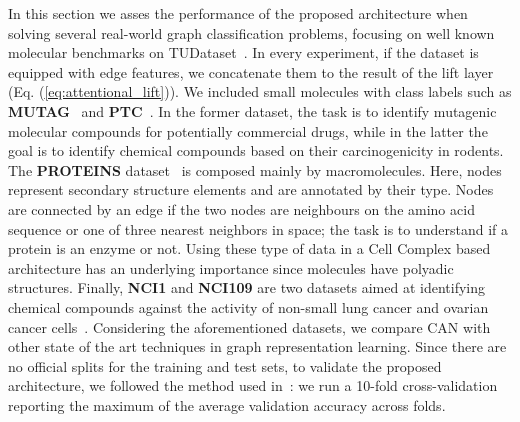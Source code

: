 \documentclass{article}
\begin{document}
In this section we asses the performance of the proposed architecture when solving several real-world graph classification problems, focusing on well known molecular benchmarks on TUDataset~\cite{TUDataset}. In every experiment, if the dataset is equipped with edge features, we concatenate them to the result of the lift layer (Eq. (\ref{eq:attentional_lift})). We included small molecules with class labels such as \textbf{MUTAG}~\cite{kazius2005derivation} and \textbf{PTC}~\cite{helma2001predictive}. In the former dataset, the task is  to identify mutagenic molecular compounds for potentially commercial drugs, while in the latter the goal is to identify chemical compounds based on their carcinogenicity in rodents. The \textbf{PROTEINS} dataset~\cite{dobson2003distinguishing} is composed mainly by macromolecules. Here, nodes represent secondary structure elements and are annotated by their type. Nodes are connected by an edge if the two nodes are neighbours on the amino acid sequence or one of three nearest neighbors in space; the task is to understand if a protein is an enzyme or not. Using these type of data in a Cell Complex based architecture has an underlying importance since molecules have polyadic structures. Finally, \textbf{NCI1} and \textbf{NCI109} are two datasets aimed at identifying chemical compounds against the activity of non-small lung cancer and ovarian cancer cells~\cite{wale2008comparison}. Considering the aforementioned datasets, we compare CAN with other state of the art techniques in graph representation learning. Since there are no official splits for the training and test sets, to validate the proposed architecture, we followed the method used in~\cite{bodnarcwnet}: we run a 10-fold cross-validation reporting the maximum of the average validation accuracy across folds.
\end{document}
